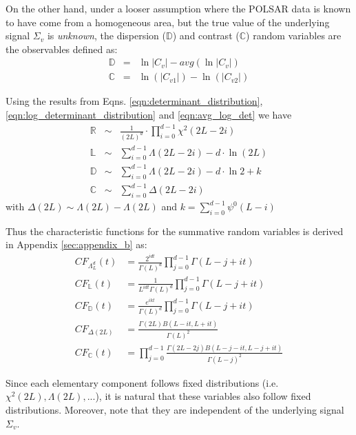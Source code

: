 \documentclass[journal]{IEEEtran}
\begin{document}
On the other hand, under a looser assumption %
  where the POLSAR data is known to have come from a homogeneous area, but the true value of the underlying signal $\Sigma_v$ is \textit{unknown},
  the dispersion ($\mathbb{D}$) and contrast ($\mathbb{C}$) random variables are the observables defined as:
\begin{eqnarray}
  \mathbb{D} &=& \ln{|C_v|} - avg(\ln{|C_v|}) \label{eqn:dispersion_observable}\\
  \mathbb{C} &=& \ln(|C_{v1}|) - \ln(|C_{v2}|) \label{eqn:contrast_observable}
\end{eqnarray}

Using the results from Eqns. \ref{eqn:determinant_distribution}, \ref{eqn:log_determinant_distribution} and \ref{eqn:avg_log_det} we have
\begin{eqnarray}
\mathbb{R} &\sim& \frac{1}{(2L)^d} \cdot \prod_{i=0}^{d-1} \chi^2 (2L-2i) \label{eqn:determinant_ratio_distribution} \\
\mathbb{L} &\sim&  \sum^{d-1}_{i=0} \Lambda(2L-2i) - d \cdot \ln(2L)
\label{eqn:log_determinant_distance_distribution} \\ 
 \mathbb{D} &\sim& \sum^{d-1}_{i=0} \Lambda(2L-2i) - d \cdot \ln{2} + k
\label{eqn:dispersion_distribution} \\ 
 \mathbb{C} &\sim& \sum^{d-1}_{i=0} \Delta(2L-2i)
\label{eqn:contrast_distribution}  
\end{eqnarray}
with $\Delta(2L) \sim \Lambda(2L) - \Lambda(2L)$
and $k=\sum^{d-1}_{i=0} \psi^0(L-i)$

Thus the characteristic functions for the summative random variables is derived in Appendix \ref{sec:appendix_b} as:
\begin{align}
  CF_{\Lambda^d_L}(t) &= \frac{2^{idt}}{\Gamma(L)^d} \prod^{d-1}_{j=0} \Gamma(L-j+it) \\
  CF_{\mathbb{L}}(t) &= \frac{1}{L^{idt} \Gamma(L)^d} \prod^{d-1}_{j=0} \Gamma(L-j+it) \\
  CF_{\mathbb{D}}(t) &= \frac{e^{ikt}}{\Gamma(L)^d} \prod^{d-1}_{j=0} \Gamma(L-j+it) \\
  CF_{\Delta(2L)} &= \frac{\Gamma(2L) B(L-it,L+it)}{\Gamma(L)^2} \\
  CF_{\mathbb{C}}(t) &=  \prod^{d-1}_{j=0} \frac{\Gamma(2L-2j) B(L-j-it,L-j+it)}{\Gamma(L-j)^2}
\end{align}

Since each elementary component follows fixed distributions (i.e. $\chi^2(2L), \Lambda(2L), ... $),
  it is natural that these variables also follow fixed distributions.
Moreover, note that they are independent of the underlying signal $\Sigma_v$.
\end{document}
